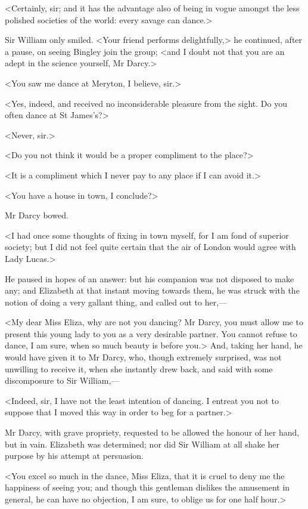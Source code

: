 <Certainly, sir; and it has the advantage also of being in vogue amongst the less polished societies of the world: every savage can dance.>

Sir William only smiled. <Your friend performs delightfully,> he continued, after a pause, on seeing Bingley join the group; <and I doubt not that you are an adept in the science yourself, Mr Darcy.>

<You saw me dance at Meryton, I believe, sir.>

<Yes, indeed, and received no inconsiderable pleasure from the sight. Do you often dance at St James's?>

<Never, sir.>

<Do you not think it would be a proper compliment to the place?>

<It is a compliment which I never pay to any place if I can avoid it.>

<You have a house in town, I conclude?>

Mr Darcy bowed.

<I had once some thoughts of fixing in town myself, for I am fond of superior society; but I did not feel quite certain that the air of London would agree with Lady Lucas.>

He paused in hopes of an answer: but his companion was not disposed to make any; and Elizabeth at that instant moving towards them, he was struck with the notion of doing a very gallant thing, and called out to her,—

<My dear Miss Eliza, why are not you dancing? Mr Darcy, you must allow me to present this young lady to you as a very desirable partner. You cannot refuse to dance, I am sure, when so much beauty is before you.> And, taking her hand, he would have given it to Mr Darcy, who, though extremely surprised, was not unwilling to receive it, when she instantly drew back, and said with some discomposure to Sir William,—

<Indeed, sir, I have not the least intention of dancing. I entreat you not to suppose that I moved this way in order to beg for a partner.>

Mr Darcy, with grave propriety, requested to be allowed the honour of her hand, but in vain. Elizabeth was determined; nor did Sir William at all shake her purpose by his attempt at persuasion.

<You excel so much in the dance, Miss Eliza, that it is cruel to deny me the happiness of seeing you; and though this gentleman dislikes the amusement in general, he can have no objection, I am sure, to oblige us for one half hour.>

